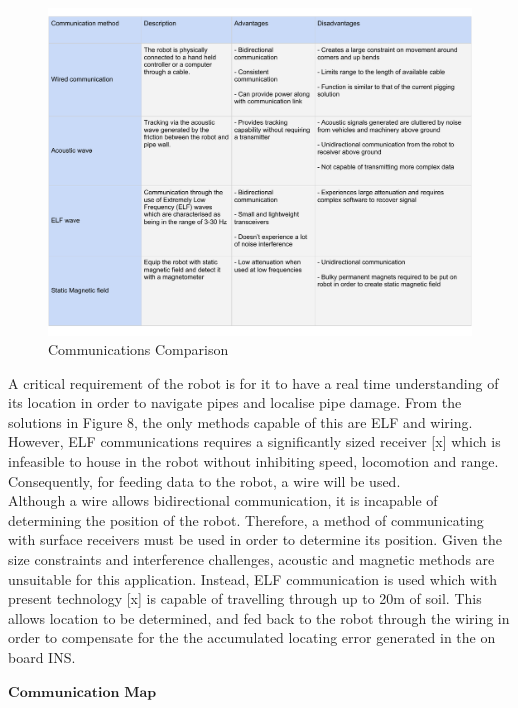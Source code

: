 \documentclass[11pt]{article}		%
\begin{document}
        \begin{figure}[h]
			\centering
			\includegraphics[scale=0.6]{commstable.pdf}
			\caption{Communications Comparison}
			\label{commsLayout}
		\end{figure}
     	A critical requirement of the robot is for it to have a real time understanding of its location in order to navigate pipes and localise pipe damage. 
     	From the solutions in Figure 8, the only methods capable of this are ELF and wiring. 
     	However, ELF communications requires a significantly sized receiver [x] which is infeasible to house in the robot without inhibiting speed, locomotion and range. 
     	Consequently, for feeding data to the robot, a wire will be used.
        \\ 
        \hspace*{3ex}Although a wire allows bidirectional communication, it is incapable of determining the position of the robot. 
        Therefore, a method of communicating with surface receivers must be used in order to determine its position. 
        Given the size constraints and interference challenges, acoustic and magnetic methods are unsuitable for this application. 
        Instead, ELF communication is used which with present technology [x] is capable of travelling through up to 20m of soil. 
        This allows location to be determined, and fed back to the robot through the wiring in order to compensate for the the accumulated locating error generated in the on board INS.
         
        $\textbf{Communication Map}$
        
\end{document}
